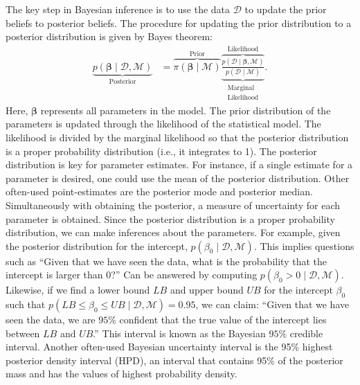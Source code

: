 \documentclass[a4paper]{article}
\newcommand{\prob}[1]{p\left(#1\right)}
\newcommand{\lik}[1]{p\left(#1\right)}
\newcommand{\data}{\mathcal{D}}
\newcommand{\model}{\mathcal{M}}
\newcommand{\prior}[1]{\pi\left(#1\right)}
\begin{document}
The key step in Bayesian inference is to use the data $\data$ to update the prior beliefs to posterior beliefs. The procedure for updating the prior distribution to a posterior distribution is given by Bayes theorem:
\begin{align*}\label{eq:BayesTheorem}
\underbrace{\prob{\bm{\beta} \mid \data , \model}}_{\text{Posterior}}
&=
\overbrace{\prior{\bm{\beta}\mid \model}}^{\text{Prior}}
\underbrace{\overbrace{
		\frac{\lik{\data \mid \bm{\beta}, \model}}{\prob{\data \mid \model}}
	}^{\text{Likelihood}}}_{\substack{\text{Marginal}\\ \text{Likelihood}}}.
\end{align*}
Here, $\bm{\beta}$ represents all parameters in the model. The prior distribution of the parameters is updated through the likelihood of the statistical model. The likelihood is divided by the marginal likelihood so that the posterior distribution is a proper probability distribution (i.e., it integrates to 1). The posterior distribution is key for parameter estimates. For instance, if a single estimate for a parameter is desired, one could use the mean of the posterior distribution. Other often-used point-estimates are the posterior mode and posterior median. Simultaneously with obtaining the posterior, a measure of uncertainty for each parameter is obtained. Since the posterior distribution is a proper probability distribution, we can make inferences about the parameters. For example, given the posterior distribution for the intercept, $\prob{\beta_0 \mid \data , \model}$. This implies questions such as ``Given that we have seen the data, what is the probability that the intercept is larger than 0?'' Can be answered by computing $\prob{\beta_0 > 0 \mid \data , \model}$. Likewise, if we find a lower bound $LB$ and upper bound $UB$ for the intercept $\beta_0$ such that $\prob{ LB \leq \beta_0 \leq UB \mid \data , \model} = 0.95$, we can claim: ``Given that we have seen the data, we are $95\%$ confident that the true value of the intercept lies between $LB$ and $UB$.'' This interval is known as the Bayesian $95\%$ credible interval. Another often-used Bayesian uncertainty interval is the 95\% highest posterior density interval (HPD), an interval that contains 95\% of the posterior mass and has the values of highest probability density.
\end{document}
